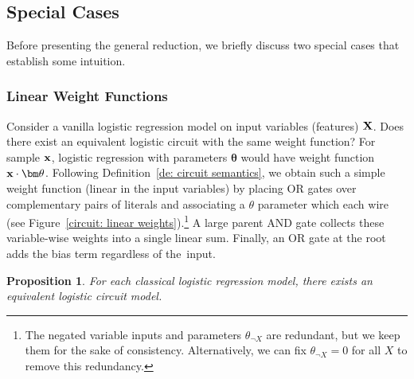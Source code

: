 \documentclass[letterpaper]{article} %
\newtheorem{proposition}[corollary]{Proposition}
\newcommand{\sample}{{\bf x}}
\begin{document}
\subsection{Special Cases}

Before presenting the general reduction, we briefly discuss two special cases that establish some intuition.

\subsubsection{Linear Weight Functions} 
Consider a vanilla logistic regression model on input variables (features) $\bf X$. 
Does there exist an equivalent logistic circuit with the same weight function?
For sample $\sample$, logistic regression with parameters ${\bm \theta}$ would have weight function $\sample \cdot {\bm \theta}$. 
Following Definition~\ref{de: circuit semantics}, we obtain such a simple weight function (linear in the input variables) by placing OR gates over complementary pairs of literals and associating a $\theta$ parameter which each wire (see Figure~\ref{circuit: linear weights}).\footnote{The negated variable inputs and parameters $\theta_{\neg X}$ are redundant, but we keep them for the sake of consistency. Alternatively, we can fix $\theta_{\neg X} = 0$ for all $X$ to remove this redundancy.} A large parent AND gate collects these variable-wise weights into a single linear sum. Finally, an OR gate at the root adds the bias term regardless of the~input.
\begin{proposition}
For each classical logistic regression model, there exists an equivalent logistic circuit model.
\end{proposition}
\end{document}
